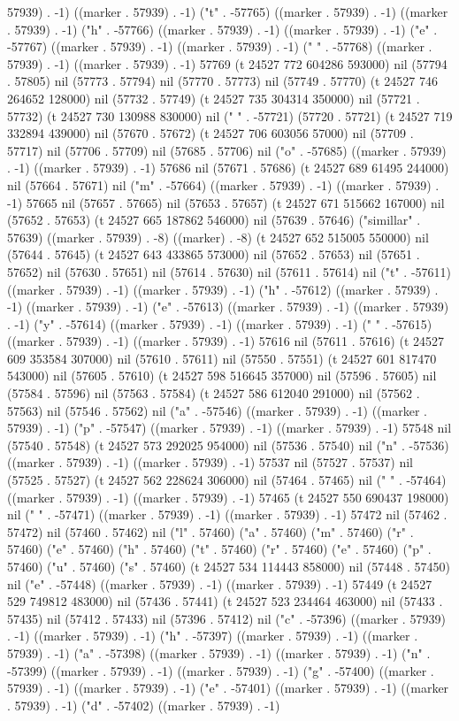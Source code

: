 57939) . -1) ((marker . 57939) . -1) ("t" . -57765) ((marker . 57939) . -1) ((marker . 57939) . -1) ("h" . -57766) ((marker . 57939) . -1) ((marker . 57939) . -1) ("e" . -57767) ((marker . 57939) . -1) ((marker . 57939) . -1) (" " . -57768) ((marker . 57939) . -1) ((marker . 57939) . -1) 57769 (t 24527 772 604286 593000) nil (57794 . 57805) nil (57773 . 57794) nil (57770 . 57773) nil (57749 . 57770) (t 24527 746 264652 128000) nil (57732 . 57749) (t 24527 735 304314 350000) nil (57721 . 57732) (t 24527 730 130988 830000) nil (" " . -57721) (57720 . 57721) (t 24527 719 332894 439000) nil (57670 . 57672) (t 24527 706 603056 57000) nil (57709 . 57717) nil (57706 . 57709) nil (57685 . 57706) nil ("o" . -57685) ((marker . 57939) . -1) ((marker . 57939) . -1) 57686 nil (57671 . 57686) (t 24527 689 61495 244000) nil (57664 . 57671) nil ("m" . -57664) ((marker . 57939) . -1) ((marker . 57939) . -1) 57665 nil (57657 . 57665) nil (57653 . 57657) (t 24527 671 515662 167000) nil (57652 . 57653) (t 24527 665 187862 546000) nil (57639 . 57646) ("simillar" . 57639) ((marker . 57939) . -8) ((marker) . -8) (t 24527 652 515005 550000) nil (57644 . 57645) (t 24527 643 433865 573000) nil (57652 . 57653) nil (57651 . 57652) nil (57630 . 57651) nil (57614 . 57630) nil (57611 . 57614) nil ("t" . -57611) ((marker . 57939) . -1) ((marker . 57939) . -1) ("h" . -57612) ((marker . 57939) . -1) ((marker . 57939) . -1) ("e" . -57613) ((marker . 57939) . -1) ((marker . 57939) . -1) ("y" . -57614) ((marker . 57939) . -1) ((marker . 57939) . -1) (" " . -57615) ((marker . 57939) . -1) ((marker . 57939) . -1) 57616 nil (57611 . 57616) (t 24527 609 353584 307000) nil (57610 . 57611) nil (57550 . 57551) (t 24527 601 817470 543000) nil (57605 . 57610) (t 24527 598 516645 357000) nil (57596 . 57605) nil (57584 . 57596) nil (57563 . 57584) (t 24527 586 612040 291000) nil (57562 . 57563) nil (57546 . 57562) nil ("a" . -57546) ((marker . 57939) . -1) ((marker . 57939) . -1) ("p" . -57547) ((marker . 57939) . -1) ((marker . 57939) . -1) 57548 nil (57540 . 57548) (t 24527 573 292025 954000) nil (57536 . 57540) nil ("n" . -57536) ((marker . 57939) . -1) ((marker . 57939) . -1) 57537 nil (57527 . 57537) nil (57525 . 57527) (t 24527 562 228624 306000) nil (57464 . 57465) nil (" " . -57464) ((marker . 57939) . -1) ((marker . 57939) . -1) 57465 (t 24527 550 690437 198000) nil (" " . -57471) ((marker . 57939) . -1) ((marker . 57939) . -1) 57472 nil (57462 . 57472) nil (57460 . 57462) nil ("l" . 57460) ("a" . 57460) ("m" . 57460) ("r" . 57460) ("e" . 57460) ("h" . 57460) ("t" . 57460) ("r" . 57460) ("e" . 57460) ("p" . 57460) ("u" . 57460) ("s" . 57460) (t 24527 534 114443 858000) nil (57448 . 57450) nil ("e" . -57448) ((marker . 57939) . -1) ((marker . 57939) . -1) 57449 (t 24527 529 749812 483000) nil (57436 . 57441) (t 24527 523 234464 463000) nil (57433 . 57435) nil (57412 . 57433) nil (57396 . 57412) nil ("c" . -57396) ((marker . 57939) . -1) ((marker . 57939) . -1) ("h" . -57397) ((marker . 57939) . -1) ((marker . 57939) . -1) ("a" . -57398) ((marker . 57939) . -1) ((marker . 57939) . -1) ("n" . -57399) ((marker . 57939) . -1) ((marker . 57939) . -1) ("g" . -57400) ((marker . 57939) . -1) ((marker . 57939) . -1) ("e" . -57401) ((marker . 57939) . -1) ((marker . 57939) . -1) ("d" . -57402) ((marker . 57939) . -1) 
